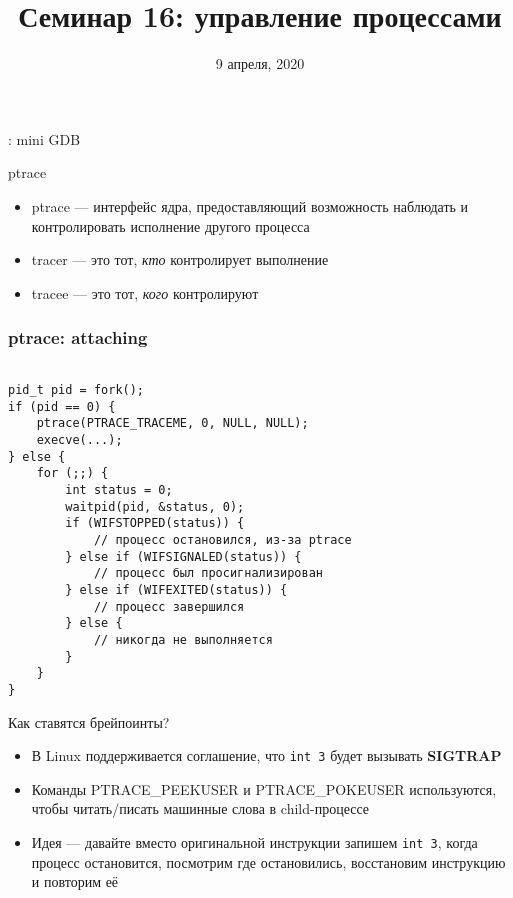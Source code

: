 \documentclass[10pt,pdf,hyperref={unicode}]{beamer}
\title{Семинар 16: управление процессами}
\date{9 апреля, 2020}
\newcommand{\asm}[1]{\texttt{#1}}
\begin{document}
\begin{frame}
  \titlepage
\end{frame}

\begin{frame}
\center{}: mini GDB
\end{frame}

\begin{frame}{ptrace}
\begin{itemize}
    \item ptrace — интерфейс ядра, предоставляющий возможность наблюдать и контролировать исполнение другого процесса
    \item tracer — это тот, \emph{кто} контролирует выполнение
    \item tracee — это тот, \emph{кого} контролируют
\end{itemize}
\end{frame}

\begin{frame}[fragile]
\frametitle{ptrace: attaching}
\begin{center}
\begin{minipage}{0.95\textwidth}
\begin{verbatim}

pid_t pid = fork();
if (pid == 0) {
    ptrace(PTRACE_TRACEME, 0, NULL, NULL);
    execve(...);
} else {
    for (;;) {
        int status = 0;
        waitpid(pid, &status, 0);
        if (WIFSTOPPED(status)) {
            // процесс остановился, из-за ptrace
        } else if (WIFSIGNALED(status)) {
            // процесс был просигнализирован
        } else if (WIFEXITED(status)) {
            // процесс завершился
        } else {
            // никогда не выполняется
        }
    }
}

\end{verbatim}
\end{minipage}
\end{center}
\end{frame}

\begin{frame}{Как ставятся брейпоинты?}
\begin{itemize}
    \item В Linux поддерживается соглашение, что \asm{int 3} будет вызывать \textbf{SIGTRAP}
    \item Команды PTRACE\_PEEKUSER и PTRACE\_POKEUSER используются, чтобы читать/писать машинные слова в child-процессе
    \item Идея — давайте вместо оригинальной инструкции запишем \asm{int 3}, когда процесс остановится, посмотрим где остановились, восстановим инструкцию и повторим её
\end{itemize}
\end{frame}
\end{document}
